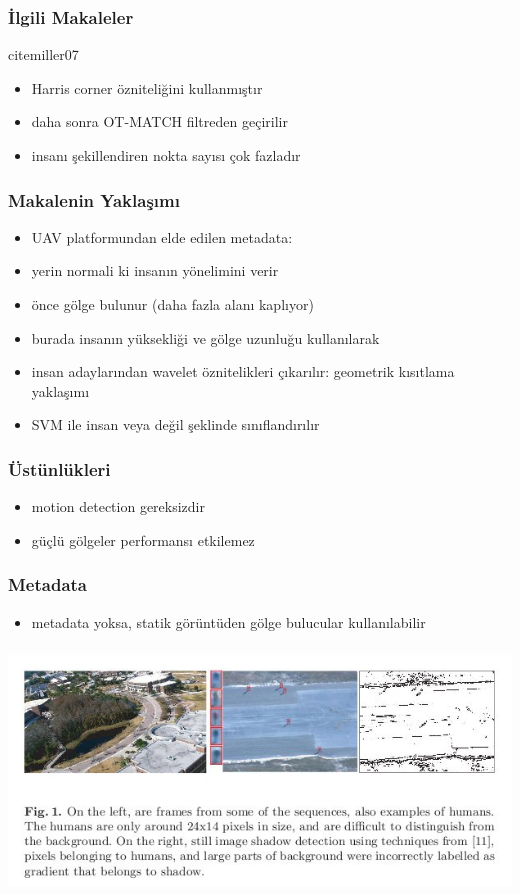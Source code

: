 \documentclass{beamer}
\begin{document}
\begin{frame}
	\frametitle {İlgili Makaleler}

	cite{miller07}

	\begin{itemize}
		\item Harris corner özniteliğini kullanmıştır
		\item daha sonra OT-MATCH filtreden geçirilir
		\item insanı şekillendiren nokta sayısı çok fazladır
	\end{itemize}
\end{frame}

\begin{frame}
	\frametitle {Makalenin Yaklaşımı}

	\begin{itemize}
		\item UAV platformundan elde edilen metadata:
		\item yerin normali ki insanın yönelimini verir
		\item önce gölge bulunur (daha fazla alanı kaplıyor)
		\item burada insanın yüksekliği ve gölge uzunluğu kullanılarak
		\item insan adaylarından wavelet öznitelikleri çıkarılır: geometrik
			  kısıtlama yaklaşımı
		\item SVM ile insan veya değil şeklinde sınıflandırılır
	\end{itemize}
\end{frame}

\begin{frame}
	\frametitle{Üstünlükleri}

	\begin{itemize}
		\item motion detection gereksizdir
		\item güçlü gölgeler performansı etkilemez
	\end{itemize}
\end{frame}

\begin{frame}
	\frametitle{Metadata}

	\begin{itemize}
		\item metadata yoksa, statik görüntüden gölge bulucular kullanılabilir
	\end{itemize}
\end{frame}

\begin{frame}
	\frametitle {}

	\includegraphics[width=1.0\textwidth]{img/fig1.jpg}
\end{frame}
\end{document}
